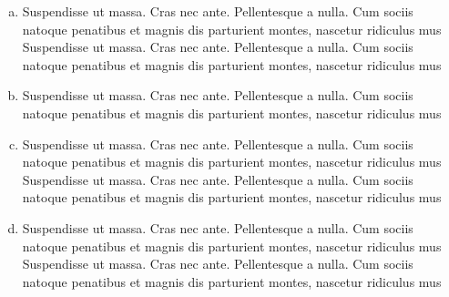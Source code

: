 \begin{enumerate}[(a)]
\item[(a)]
 Suspendisse ut massa. Cras nec ante. Pellentesque a nulla. Cum sociis
natoque penatibus et magnis dis parturient montes, nascetur ridiculus mus
Suspendisse ut massa. Cras nec ante. Pellentesque a nulla. Cum sociis
natoque penatibus et magnis dis parturient montes, nascetur ridiculus mus
\item[(b)]
 Suspendisse ut massa. Cras nec ante. Pellentesque a nulla. Cum sociis
natoque penatibus et magnis dis parturient montes, nascetur ridiculus mus
\item[(c)]
 Suspendisse ut massa. Cras nec ante. Pellentesque a nulla. Cum sociis
natoque penatibus et magnis dis parturient montes, nascetur ridiculus mus  Suspendisse ut massa. Cras nec ante. Pellentesque a nulla. Cum sociis
natoque penatibus et magnis dis parturient montes, nascetur ridiculus mus
\item[(d)]
 Suspendisse ut massa. Cras nec ante. Pellentesque a nulla. Cum sociis
natoque penatibus et magnis dis parturient montes, nascetur ridiculus mus Suspendisse ut massa. Cras nec ante. Pellentesque a nulla. Cum sociis
natoque penatibus et magnis dis parturient montes, nascetur ridiculus mus
\end{enumerate}

